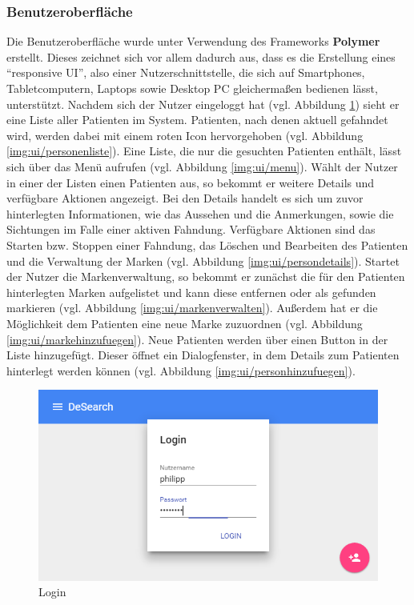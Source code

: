 \subsubsection{Benutzeroberfläche}\label{sssec:ui}
Die Benutzeroberfläche wurde unter Verwendung des Frameworks \textbf{Polymer} erstellt. Dieses zeichnet sich vor allem dadurch aus, dass es die Erstellung eines \enquote{responsive UI}, also einer Nutzerschnittstelle, die sich auf Smartphones, Tabletcomputern, Laptops sowie Desktop PC gleichermaßen bedienen lässt, unterstützt.\newline
Nachdem sich der Nutzer eingeloggt hat (vgl. Abbildung \ref{img:ui/login}) sieht er eine Liste aller Patienten im System. Patienten, nach denen aktuell gefahndet wird, werden dabei mit einem roten Icon hervorgehoben (vgl. Abbildung \ref{img:ui/personenliste}). Eine Liste, die nur die gesuchten Patienten enthält, lässt sich über das Menü aufrufen (vgl. Abbildung \ref{img:ui/menu}). \newline
Wählt der Nutzer in einer der Listen einen Patienten aus, so bekommt er weitere Details und verfügbare Aktionen angezeigt. Bei den Details handelt es sich um zuvor hinterlegten Informationen, wie das Aussehen und die Anmerkungen, sowie die Sichtungen im Falle einer aktiven Fahndung. Verfügbare Aktionen sind das Starten bzw. Stoppen einer Fahndung, das Löschen und Bearbeiten des Patienten und die Verwaltung der Marken (vgl. Abbildung \ref{img:ui/persondetails}). \newline
Startet der Nutzer die Markenverwaltung, so bekommt er zunächst die für den Patienten hinterlegten Marken aufgelistet und kann diese entfernen oder als gefunden markieren (vgl. Abbildung \ref{img:ui/markenverwalten}). Außerdem hat er die Möglichkeit dem Patienten eine neue Marke zuzuordnen (vgl. Abbildung \ref{img:ui/markehinzufuegen}). \newline
Neue Patienten werden über einen Button in der Liste hinzugefügt. Dieser öffnet ein Dialogfenster, in dem Details zum Patienten hinterlegt werden können (vgl. Abbildung \ref{img:ui/personhinzufuegen}).

\begin{figure}
	\centering
	\includegraphics[width=1.0\linewidth]{images/ui/login}
	\caption{Login}
	\label{img:ui/login}
\end{figure}

